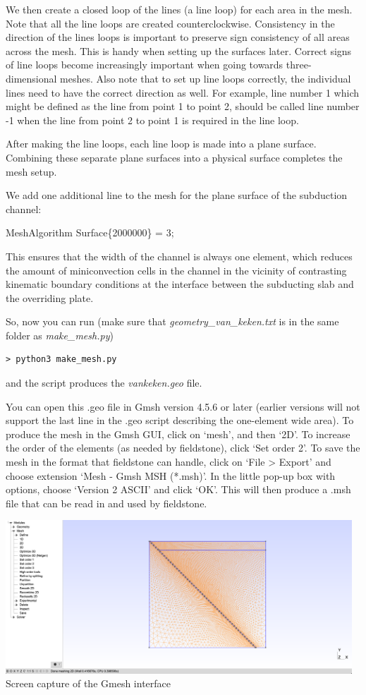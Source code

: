 We then create a closed loop of the lines (a line loop) for each area in the mesh. Note that all the line loops are created counterclockwise. Consistency in the direction of the lines loops is important to preserve sign consistency of all areas across the mesh. This is handy when setting up the surfaces later. Correct signs of line loops become increasingly important when going towards three-dimensional meshes. Also note that to set up line loops correctly, the individual lines need to have the correct direction as well. For example, line number 1 which might be defined as the line from point 1 to point 2, should be called line number -1 when the line from point 2 to point 1 is required in the line loop. 

After making the line loops, each line loop is made into a plane surface. Combining these separate plane surfaces into a physical surface completes the mesh setup. 

We add one additional line to the mesh for the plane surface of the subduction channel:

MeshAlgorithm Surface\{2000000\} = 3;

This ensures that the width of the channel is always one element, which reduces the amount of miniconvection cells in the channel in the vicinity of contrasting kinematic boundary conditions at the interface between the subducting slab and the overriding plate. 

So, now you can run
(make sure that {\sl geometry\_van\_keken.txt} is in the same folder as {\sl make\_mesh.py})
\begin{verbatim}
> python3 make_mesh.py
\end{verbatim}
and the script produces the {\sl vankeken.geo} file. 

You can open this .geo file in Gmsh version 4.5.6 or later (earlier versions will not support the 
last line in the .geo script describing the one-element wide area). To produce the mesh in 
the Gmsh GUI, click on `mesh', and then `2D'. To increase the order of the 
elements (as needed by fieldstone), click `Set order 2'. To save the mesh in the 
format that fieldstone can handle, click on `File > Export' and choose extension `Mesh - Gmsh MSH (*.msh)'. 
In the little pop-up box with options, choose `Version 2 ASCII' and click `OK'. This will then 
produce a .msh file that can be read in and used by fieldstone. 

\begin{center}
\includegraphics[width=13cm]{python_codes/fieldstone_68/images/gmsh}\\
{\captionfont Screen capture of the Gmesh interface}
\end{center}


